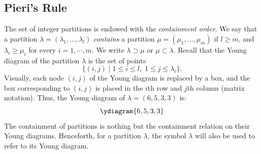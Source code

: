 \documentclass[11pt]{amsproc}
\theoremstyle{definition}
\theoremstyle{example}
\begin{document}
\subsection{Pieri's Rule}
\label{sec:pieri}
The set of integer partitions is endowed with the \emph{containment order}.
We say that a partition $\lambda=(\lambda_1,\dotsc,\lambda_l)$ \emph{contains} a partition $\mu=(\mu_1,\dotsc, \mu_m)$ if $l \geq m$, and $\lambda_i\geq \mu_i$ for every $i=1,\dotsb, m$.
We write $\lambda\supset\mu$ or $\mu \subset \lambda$.
Recall that the Young diagram of the partition $\lambda$ is the set of points 
\begin{displaymath}
\{(i, j)\mid 1\leq i\leq l,\; 1\leq j\leq \lambda_i\}.
\end{displaymath}
Visually, each node $(i,j)$ of the Young diagram is replaced by a box, and the box corresponding to $(i,j)$ is placed in the $i$th row and $j$th column (matrix notation).
Thus, the Young diagram of $\lambda=(6, 5, 3, 3)$ is:
\begin{displaymath}
  \ydiagram{6,5,3,3}
\end{displaymath}
The containment of partitions is nothing but the containment relation on their Young diagrams.
Henceforth, for a partition $\lambda$, the symbol $\lambda$ will also be used to refer to its Young diagram.
\end{document}
